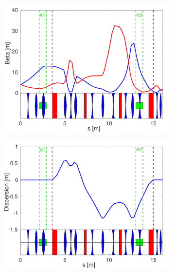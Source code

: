 \documentclass[%
 reprint,
 superscriptaddress,
 amsmath,
 amssymb,
 prstab,
]{revtex4-1}
\begin{document}
\begin{figure}
	\begin{subfigure}{\columnwidth}
		\includegraphics[width=\textwidth]{figs/optics/pffOpticsBeta_chicane}
		\caption{}
		\label{f:pffOpticsBeta}
	\end{subfigure}
	\begin{subfigure}{\columnwidth}
		\includegraphics[width=\textwidth]{figs/optics/pffOpticsDisp_chicane}
		\caption{}
		\label{f:pffOpticsDisp_chicane}
	\end{subfigure}


\end{figure}
\end{document}
